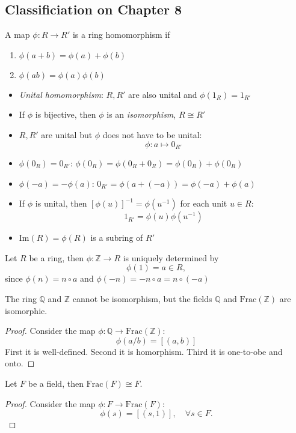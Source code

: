 \subsection{Classificiation on Chapter 8}
\begin{definition}
A map $\phi:R\to R'$ is a ring homomorphism if
\begin{enumerate}
\item
$\phi(a+b)=\phi(a)+\phi(b)$
\item
$\phi(ab)=\phi(a)\phi(b)$
\end{enumerate}
\begin{itemize}
\item
\emph{Unital homomorphism}: $R,R'$ are also unital and $\phi(1_R)=1_{R'}$
\item
If $\phi$ is bijective, then $\phi$ is an \emph{isomorphism}, $R\cong R'$
\item
$R,R'$ are unital but $\phi$ does not have to be unital: 
\[
\phi: a\mapsto 0_{R'}
\]
\end{itemize}
\end{definition}
\begin{itemize}
\item
$\phi(0_R)=0_{R'}$: $\phi(0_R)=\phi(0_R+0_R)=\phi(0_R)+\phi(0_R)$
\item
$\phi(-a)=-\phi(a)$: $0_{R'}=\phi(a+(-a))=\phi(-a)+\phi(a)$
\item
If $\phi$ is unital, then $[\phi(u)]^{-1}=\phi(u^{-1})$ for each unit $u\in R$:
\[
1_{R'}=\phi(u)\phi(u^{-1})
\]
\item
$\mbox{Im}(R)=\phi(R)$ is a subring of $R'$
\end{itemize}
\begin{remark}
Let $R$ be a ring, then $\phi: \mathbb{Z}\to R$ is uniquely determined by
\[
\phi(1)=a\in R,
\]
since $\phi(n)=n\circ a$ and $\phi(-n)=-n\circ a=n\circ(-a)$
\end{remark}
\begin{proposition}
The ring $\mathbb{Q}$ and $\mathbb{Z}$ cannot be isomorphism, but the fields $\mathbb{Q}$ and $\mbox{Frac}(\mathbb{Z})$ are isomorphic.
\end{proposition}
\begin{proof}
Consider the map $\phi:\mathbb{Q}\to\mbox{Frac}(\mathbb{Z})$:
\[
\phi(a/b)=[(a,b)]
\]
First it is well-defined. Second it is homorphism. Third it is one-to-obe and onto.
\end{proof}
\begin{theorem}
Let $F$ be a field, then $\mbox{Frac}(F)\cong F$.
\end{theorem}
\begin{proof}
Consider the map $\phi:F\to\mbox{Frac}(F)$:
\[
\phi(s)=[(s,1)],\quad\forall s\in F.
\]
\end{proof}

